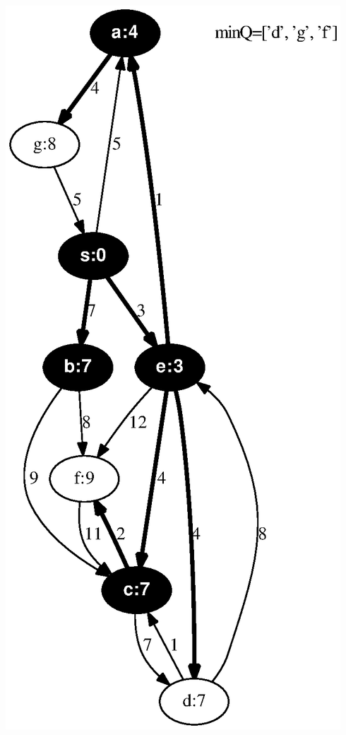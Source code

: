\documentclass{article}
\begin{document}
\includegraphics[height=.3\textheight]{dijkstra_gross_yellen_05.eps}
\vspace{1em}
\end{document}
